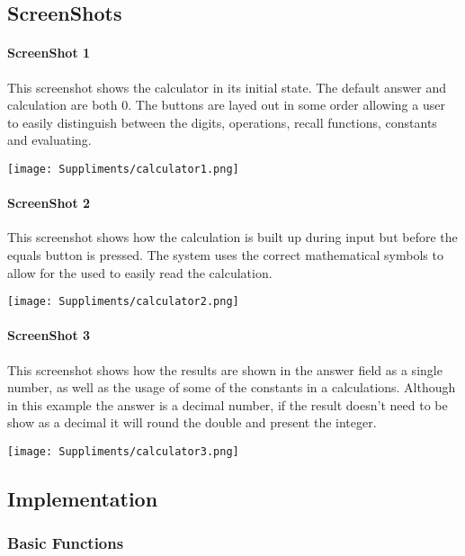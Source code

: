 \documentclass[a4paper]{article}
\begin{document}
\subsection{ScreenShots}
\paragraph{ScreenShot 1}
This screenshot shows the calculator in its initial state.
The default answer and calculation are both 0.
The buttons are layed out in some order allowing a user to easily distinguish between the digits, operations, recall functions, constants and evaluating.
\begin{center}
    \texttt{[image: Suppliments/calculator1.png]}
\end{center}
\paragraph{ScreenShot 2}
This screenshot shows how the calculation is built up during input but before the equals button is pressed.
The system uses the correct mathematical symbols to allow for the used to easily read the calculation.
\begin{center}
    \texttt{[image: Suppliments/calculator2.png]}
\end{center}
\paragraph{ScreenShot 3}
This screenshot shows how the results are shown in the answer field as a single number, as well as the usage of some of the constants in a calculations.
Although in this example the answer is a decimal number, if the result doesn't need to be show as a decimal it will round the double and present the integer.
\begin{center}
    \texttt{[image: Suppliments/calculator3.png]}
\end{center}

\subsection{Implementation}
\subsubsection{Basic Functions}
\end{document}
